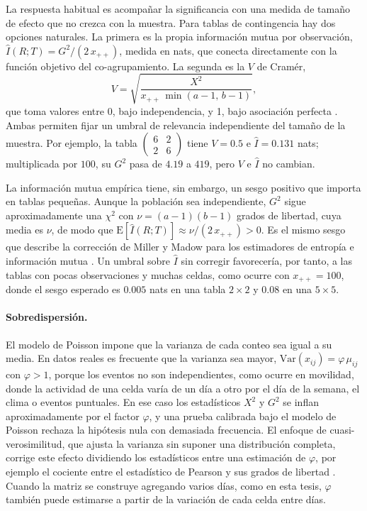 La respuesta habitual es acompañar la significancia con una medida de tamaño de
efecto que no crezca con la muestra. Para tablas de contingencia hay dos opciones
naturales. La primera es la propia información mutua por observación,
$\hat I(R;T) = G^2/(2\,x_{++})$, medida en nats, que conecta directamente con la
función objetivo del co-agrupamiento. La segunda es la $V$ de Cramér,
\begin{equation}\label{eq:cramer}
  V = \sqrt{\frac{X^2}{x_{++}\,\min(a-1,\, b-1)}} ,
\end{equation}
que toma valores entre 0, bajo independencia, y 1, bajo asociación perfecta
\cite{Agresti2013}. Ambas permiten fijar un umbral de relevancia independiente
del tamaño de la muestra. Por ejemplo, la tabla $\begin{pmatrix} 6 & 2 \\ 2 & 6 \end{pmatrix}$ tiene $V = 0.5$ e $\hat I = 0.131$ nats; multiplicada por $100$, su $G^2$ pasa de $4.19$ a $419$, pero $V$ e $\hat I$ no cambian.

La información mutua empírica tiene, sin embargo, un sesgo positivo que importa
en tablas pequeñas. Aunque la población sea independiente, $G^2$ sigue
aproximadamente una $\chi^2$ con $\nu = (a-1)(b-1)$ grados de libertad, cuya
media es $\nu$, de modo que $\mathrm{E}[\hat I(R;T)] \approx \nu/(2\,x_{++}) > 0$.
Es el mismo sesgo que describe la corrección de Miller y Madow para los
estimadores de entropía e información mutua \cite{Paninski2003}. Un umbral
sobre $\hat I$ sin corregir favorecería, por tanto, a las tablas con pocas observaciones y muchas celdas, como ocurre con $x_{++} = 100$, donde el sesgo esperado es $0.005$ nats en una tabla $2 \times 2$ y $0.08$ en una $5 \times 5$.

\paragraph{Sobredispersión.} El modelo de Poisson impone que la varianza de cada
conteo sea igual a su media. En datos reales es frecuente que la varianza sea
mayor, $\mathrm{Var}(x_{ij}) = \varphi\,\mu_{ij}$ con $\varphi > 1$, porque los
eventos no son independientes, como ocurre en movilidad, donde la actividad de una celda varía de un
día a otro por el día de la semana, el clima o eventos puntuales. En ese caso los
estadísticos $X^2$ y $G^2$ se inflan aproximadamente por el factor $\varphi$, y
una prueba calibrada bajo el modelo de Poisson rechaza la hipótesis nula con
demasiada frecuencia. El enfoque de cuasi-verosimilitud, que ajusta la varianza sin suponer una distribución completa, corrige este efecto
dividiendo los estadísticos entre una estimación de $\varphi$, por ejemplo el
cociente entre el estadístico de Pearson y sus grados de libertad
\cite{McCullagh1989}. Cuando la matriz se construye agregando varios días, como en
esta tesis, $\varphi$ también puede estimarse a partir de la variación de cada
celda entre días.

